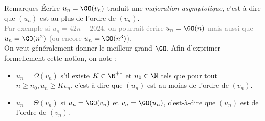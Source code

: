 \documentclass[10pt]{beamer}
\begin{document}
\begin{frame}[fragile]{\Ctitle}{\stitle}
	\begin{block}{Remarques}
		Écrire $u_n = \GO(v_n)$ traduit une \textit{majoration asymptotique}, c'est-à-dire que \og{}$(u_n)$ est au plus de l'ordre de $(v_n)$\fg{}.\\
		\textcolor{gray}{Par exemple si $u_n = 42n+2024$, on pourrait écrire $u_n = \GO(n)$ mais aussi que $u_n = \GO(n^2)$ (ou encore $u_n = \GO(n^3)$).}\\
		On veut généralement donner le \og{}meilleur grand $\GO$\fg{}. Afin d'exprimer formellement cette notion, on note :
		\begin{itemize}
			\item<2-> $u_n = \Omega(v_n)$ s'il existe $K \in \R^{+*}$ et $n_0 \in \N$ tels que pour tout $n \geqslant n_0, u_n \geqslant Kv_n$, c'est-à-dire que \og{}$(u_n)$ est au moins de l'ordre de $(v_n)$\fg{}.\\
			\item<3-> $u_n = \Theta(v_n)$ si $u_n = \GO(v_n)$ et $v_n = \GO(u_n)$, c'est-à-dire que \og{}$(u_n)$ est de l'ordre de $(v_n)$\fg{}.\\
		\end{itemize}
	\end{block}
\end{frame}
\end{document}
